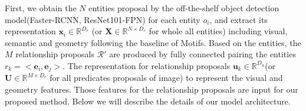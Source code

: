 First, we obtain the $N$ entities proposal by the off-the-shelf object detection model(Faster-RCNN, ResNet101-FPN) for each entity $o_i$, and extract its representation $\mathbf{x}_i \in \mathbb{R}^{D_e}$ (or $\mathbf{X} \in \mathbb{R}^{N \times D_e}$ for whole all entities) including visual, semantic and geometry following the baseline of Motifs\cite{zellers_neural_2017}.
Based on the entities, the $M$ relationship proposals $\mathcal{R}'$ are produced by fully connected pairing the entities $r_k = <\mathbf{e}_i, \mathbf{e}_j>$. 
The representation for relationship proposals $\mathbf{u}_k \in \mathbb{R}^{D_u}$(or $\mathbf{U} \in \mathbb{R}^{M \times D_r}$ for all predicates proposals of image) to represent the visual and geometry features. 
Those features for the relationship proposals are input for our proposed method. Below we will describe the details of our model architecture.






